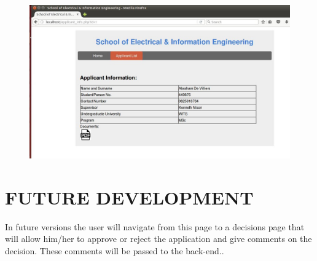 \documentclass[journal,comsoc,onecolumn]{IEEEtran}
\begin{document}
\begin{figure}
\centering
\includegraphics[width=0.7\linewidth]{info}
\caption{}
\label{fig:info}
\end{figure}


\section{FUTURE DEVELOPMENT}
In future versions the user will navigate from this page to a decisions page that will allow him/her to approve or reject the application and give comments on the decision. These comments will be passed to the back-end..
\end{document}
